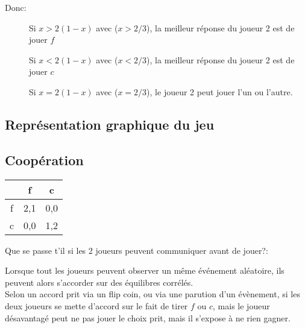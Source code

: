 Donc:
\begin{description}
\item[] Si $x > 2(1-x)$ avec ($x > 2/3$), la meilleur réponse du joueur 2 est de jouer $f$
\item[] Si $x < 2(1-x)$ avec ($x < 2/3$), la meilleur réponse du joueur 2 est de jouer $c$
\item[] Si $x = 2(1-x)$ avec ($x = 2/3$), le joueur 2 peut jouer l'un ou l'autre.
\end{description}


\subsection{Représentation graphique du jeu}

\pagebreak
\subsection{Coopération}

\begin{tabular}{c|cc}
$ $ & f & c\\
\hline
f & 2,1 & 0,0\\
c & 0,0 & 1,2\\
\end{tabular}

Que se passe t'il si les 2 joueurs peuvent communiquer avant de jouer?:

Lorsque tout les joueurs peuvent observer un même événement aléatoire, ils peuvent alors s'accorder sur des équilibres corrélés.\\
Selon un accord prit via un flip coin, ou via une parution d'un évènement, si les deux joueurs se mette d'accord sur le fait de tirer $f$ ou $c$, mais le joueur désavantagé peut ne pas jouer le choix prit, mais il s'expose à ne rien gagner.\\


